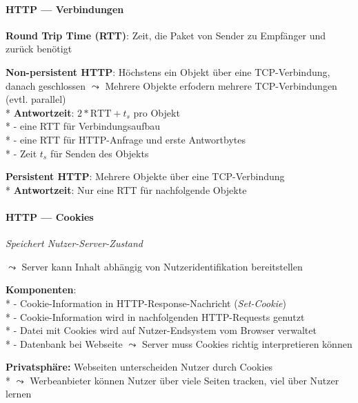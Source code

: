 \paragraph{HTTP --- Verbindungen}
\begin{items}
  \item \textbf{Round Trip Time (RTT)}: Zeit, die Paket von Sender zu Empfänger und zurück benötigt
  \item \textbf{Non-persistent HTTP}: Höchstens ein Objekt über eine TCP-Verbindung, danach geschlossen \( \leadsto \) Mehrere Objekte erfodern mehrere TCP-Verbindungen (evtl. parallel)\\*
  \textbf{Antwortzeit}: \( 2*\text{RTT} + t_s \) pro Objekt\\*
  	- eine RTT für Verbindungsaufbau \\*
  	- eine RTT für HTTP-Anfrage und erste Antwortbytes \\*
  	- Zeit \( t_s \) für Senden des Objekts
  \item \textbf{Persistent HTTP}: Mehrere Objekte über eine TCP-Verbindung\\*
  \textbf{Antwortzeit}: Nur eine RTT für nachfolgende Objekte
\end{items}

\paragraph{HTTP --- Cookies}
\begin{items}
  \item \emph{Speichert Nutzer-Server-Zustand}
  \item \( \leadsto \) Server kann Inhalt abhängig von Nutzeridentifikation bereitstellen
  \item \textbf{Komponenten}: \\*
    - Cookie-Information in HTTP-Response-Nachricht (\textit{Set-Cookie}) \\*
    - Cookie-Information wird in nachfolgenden HTTP-Requests genutzt \\*
    - Datei mit Cookies wird auf Nutzer-Endsystem vom Browser verwaltet \\*
    - Datenbank bei Webseite \( \leadsto \) Server muss Cookies richtig interpretieren können
	\item \textbf{Privatsphäre: } Webseiten unterscheiden Nutzer durch Cookies \\*
    	\( \leadsto \) Werbeanbieter können Nutzer über viele Seiten tracken, viel über Nutzer lernen
\end{items}

